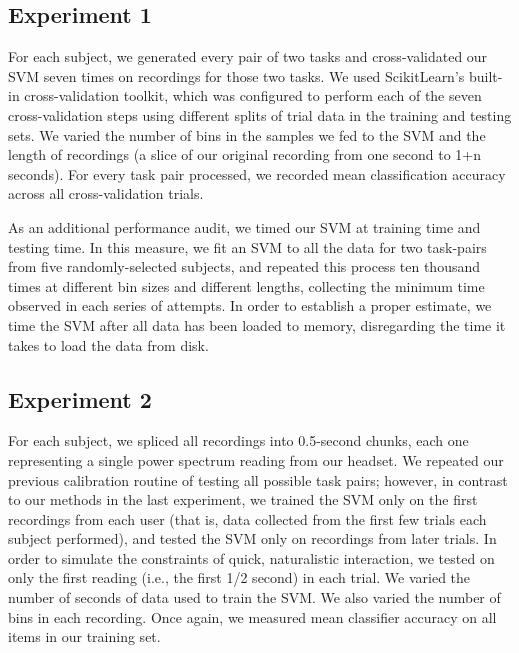 
\subsection{Experiment 1}

For each subject, we generated every pair of two tasks and cross-validated our SVM seven times on recordings for those two tasks. We used ScikitLearn's built-in cross-validation toolkit, which was configured to perform each of the seven cross-validation steps using different splits of trial data in the training and testing sets. We varied the number of bins in the samples we fed to the SVM and the length of recordings (a slice of our original recording from one second to 1+n seconds). For every task pair processed, we recorded mean classification accuracy across all cross-validation trials.

As an additional performance audit, we timed our SVM at training time and testing time. In this measure, we fit an SVM to all the data for two task-pairs from five randomly-selected subjects, and repeated this process ten thousand times at different bin sizes and different lengths, collecting the minimum time observed in each series of attempts. In order to establish a proper estimate, we time the SVM after all data has been loaded to memory, disregarding the time it takes to load the data from disk.

\subsection{Experiment 2}

For each subject, we spliced all recordings into 0.5-second chunks, each one representing a single power spectrum reading from our headset. We repeated our previous calibration routine of testing all possible task pairs; however, in contrast to our methods in the last experiment, we trained the SVM only on the first recordings from each user (that is, data collected from the first few trials each subject performed), and tested the SVM only on recordings from later trials. In order to simulate the constraints of quick, naturalistic interaction, we tested on only the first reading (i.e., the first 1/2 second) in each trial. We varied the number of seconds of data used to train the SVM. We also varied the number of bins in each recording. Once again, we measured mean classifier accuracy on all items in our training set.
